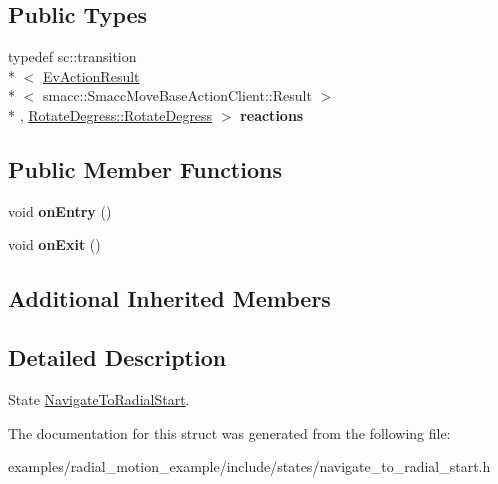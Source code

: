 \subsection*{Public Types}
\begin{DoxyCompactItemize}
\item 
\hypertarget{structNavigateToRadialStart_1_1NavigateToRadialStart_a17f989999daba76df5aebd3424e54091}{typedef sc\-::transition\\*
$<$ \hyperlink{structsmacc_1_1EvActionResult}{Ev\-Action\-Result}\\*
$<$ smacc\-::\-Smacc\-Move\-Base\-Action\-Client\-::\-Result $>$\\*
, \hyperlink{structRotateDegress_1_1RotateDegress}{Rotate\-Degress\-::\-Rotate\-Degress} $>$ {\bfseries reactions}}\label{structNavigateToRadialStart_1_1NavigateToRadialStart_a17f989999daba76df5aebd3424e54091}

\end{DoxyCompactItemize}
\subsection*{Public Member Functions}
\begin{DoxyCompactItemize}
\item 
\hypertarget{structNavigateToRadialStart_1_1NavigateToRadialStart_a99d667686b14a7703ddad496c9082d10}{void {\bfseries on\-Entry} ()}\label{structNavigateToRadialStart_1_1NavigateToRadialStart_a99d667686b14a7703ddad496c9082d10}

\item 
\hypertarget{structNavigateToRadialStart_1_1NavigateToRadialStart_a6dbd559acd3df7fd07f660d75a9a487e}{void {\bfseries on\-Exit} ()}\label{structNavigateToRadialStart_1_1NavigateToRadialStart_a6dbd559acd3df7fd07f660d75a9a487e}

\end{DoxyCompactItemize}
\subsection*{Additional Inherited Members}


\subsection{Detailed Description}
State \hyperlink{structNavigateToRadialStart_1_1NavigateToRadialStart}{Navigate\-To\-Radial\-Start}. 

The documentation for this struct was generated from the following file\-:\begin{DoxyCompactItemize}
\item 
examples/radial\-\_\-motion\-\_\-example/include/states/navigate\-\_\-to\-\_\-radial\-\_\-start.\-h\end{DoxyCompactItemize}

